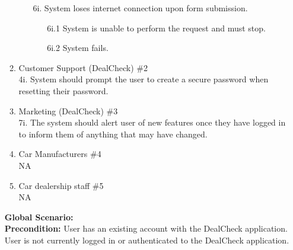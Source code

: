 \documentclass[]{article}
\begin{document}
\begin{enumerate}[{\bf {BE}1.}]
\begin{enumerate}[{\bf VP1.}]
\begin{enumerate}
\begin{enumerate}
    		\end{enumerate}
    		\item [6i.] System loses internet connection upon form submission.
    		\begin{enumerate}
    			\item [6i.1] System is unable to perform the request and must stop.
    			\item [6i.2] System fails.
    		\end{enumerate}
            \end{enumerate}
		\item Customer Support (DealCheck) \#2 \\
			4i. System should prompt the user to create a secure password when resetting their password.
		\item Marketing (DealCheck) \#3 \\
			7i. The system should alert user of new features once they have logged in to inform them of anything that may have changed.
		\item Car Manufacturers \#4 \\
			NA
		\item Car dealership staff \#5 \\
			NA
	\end{enumerate}
	{\bf Global Scenario:}\\
	{\bf Precondition:} User has an existing account with the DealCheck application. User is not currently logged in or authenticated to the DealCheck application.


\end{enumerate}
\end{document}
